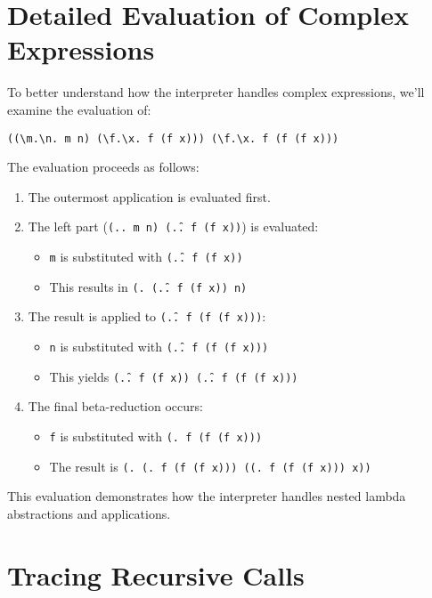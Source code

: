\documentclass{article}
\theoremstyle{theorem}
\theoremstyle{definition}
\theoremstyle{remark}
\begin{document}
\section{Detailed Evaluation of Complex Expressions}

To better understand how the interpreter handles complex expressions, we'll examine the evaluation of:

\begin{verbatim}
((\m.\n. m n) (\f.\x. f (f x))) (\f.\x. f (f (f x)))
\end{verbatim}

The evaluation proceeds as follows:

\begin{enumerate}
    \item The outermost application is evaluated first.
    \item The left part (\texttt{(\m.\n. m n) (\f.\x. f (f x))}) is evaluated:
        \begin{itemize}
            \item \texttt{m} is substituted with \texttt{(\f.\x. f (f x))}
            \item This results in \texttt{(\n. (\f.\x. f (f x)) n)}
        \end{itemize}
    \item The result is applied to \texttt{(\f.\x. f (f (f x)))}:
        \begin{itemize}
            \item \texttt{n} is substituted with \texttt{(\f.\x. f (f (f x)))}
            \item This yields \texttt{(\f.\x. f (f x)) (\f.\x. f (f (f x)))}
        \end{itemize}
    \item The final beta-reduction occurs:
        \begin{itemize}
            \item \texttt{f} is substituted with \texttt{(\x. f (f (f x)))}
            \item The result is \texttt{(\x. (\x. f (f (f x))) ((\x. f (f (f x))) x))}
        \end{itemize}
\end{enumerate}

This evaluation demonstrates how the interpreter handles nested lambda abstractions and applications.

\section{Tracing Recursive Calls}
\end{document}
